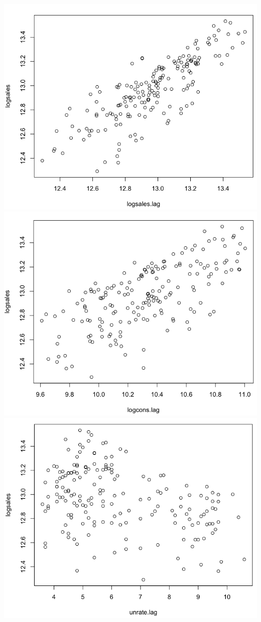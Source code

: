 \documentclass[a4 paper, 11 pt]{article}
\begin{document}
\begin{center}
\includegraphics[scale=0.3]{salessales}
\includegraphics[scale=0.3]{salescons}
\includegraphics[scale=0.3]{salesunrate}

\end{center}
\end{document}
